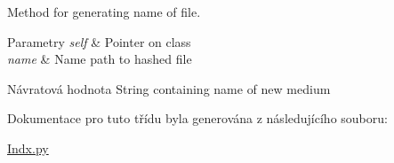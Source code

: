 Method for generating name of file. 


\begin{DoxyParams}{Parametry}
{\em self} & Pointer on class \\
\hline
{\em name} & Name path to hashed file \\
\hline
\end{DoxyParams}
\begin{DoxyReturn}{Návratová hodnota}
String containing name of new medium 
\end{DoxyReturn}


Dokumentace pro tuto třídu byla generována z následujícího souboru\-:\begin{DoxyCompactItemize}
\item 
\hyperlink{Indx_8py}{Indx.\-py}\end{DoxyCompactItemize}
